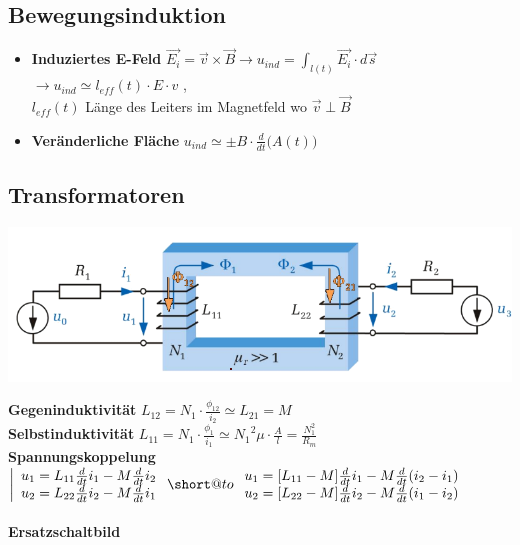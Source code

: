 \documentclass[a4paper, 6pt, landscape]{scrartcl}
\makeatletter
\DeclareRobustCommand{\shortto}{%
  \mathrel{\mathpalette\short@to\relax}%
}
\newcommand{\short@to}[2]{%
  \mkern2mu
  \clipbox{{.5\width} 0 0 0}{$\m@th#1\vphantom{+}{\shortrightarrow}$}%
  }
\makeatother
\begin{document}
\begin{multicols*}{4}
  \subsection{Bewegungsinduktion}
  \begin{itemize}
    \item \textbf{Induziertes E-Feld} $\vec{E_i} = \vec{v} \times \vec{B} \rightarrow u_{ind} = \int_{l(t)} \vec{E_i} \cdot d\vec{s}$  \\
    $\rightarrow u_{ind} \simeq l_{eff}(t) \cdot E \cdot v$ , \\ $l_{eff}(t)$ Länge des Leiters im Magnetfeld wo $\vec{v} \perp \vec{B}  $

    \item \textbf{Veränderliche Fläche} $u_{ind} \simeq \pm B\cdot \frac{d}{dt}\big(A(t)\big)$


  \end{itemize}

\vfill\null \columnbreak


\subsection{Transformatoren}
\begin{center}

  \includegraphics[scale=1]{source/trafo.png}
\end{center}
  \textbf{Gegeninduktivität} $ \displaystyle L_{12} = N_1 \cdot \frac{\phi_{12} }{i_2} \simeq L_{21} = M $ \\
  \textbf{Selbstinduktivität} $ \displaystyle L_{11} = N_1 \cdot \frac{\phi_{1} }{i_1} \simeq {N_1}^2 \mu \cdot \frac{A}{l} =\frac{N_1^2}{R_m}$ \\
  \textbf{Spannungskoppelung} \\
  $\bigg|
  \begin{array}{c} u_1 = L_{11} \frac{d}{dt}i_1 - M  \frac{d}{dt}i_2 \\
   u_2 = L_{22} \frac{d}{dt}i_2 - M  \frac{d}{dt}i_1
   \end{array} \shortto  \begin{array}{c} u_1 = [L_{11}-M] \frac{d}{dt}i_1 - M  \frac{d}{dt}(i_2-i_1) \\
    u_2 = [L_{22}-M] \frac{d}{dt}i_2 - M  \frac{d}{dt}(i_1-i_2)
    \end{array} $ \\
    \vspace{0.1cm} \\
    \textbf{Ersatzschaltbild}
      \vspace{-0.2cm}
    \begin{center}


\end{center}
\end{multicols*}
\end{document}
